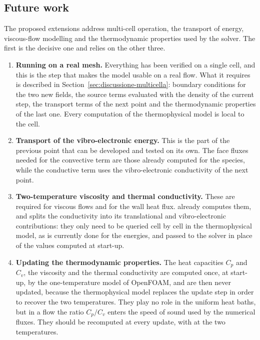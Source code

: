 \subsection{Future work}
\label{sec:sviluppi}

The proposed extensions address multi-cell operation, the transport of
energy, viscous-flow modelling and the thermodynamic properties used by the
solver. The first is the decisive one and relies on the other three.

\begin{enumerate}[leftmargin=1.8em]
  \item \textbf{Running on a real mesh.} Everything has been verified on a
    single cell, and this is the step that makes the model usable on a real
    flow. What it requires is described in
    Section~\ref{sec:discussione-multicella}: boundary conditions for the two
    new fields, the source terms evaluated with the density of the current
    step, the transport terms of the next point and the thermodynamic
    properties of the last one. Every computation of the thermophysical model
    is local to the cell.
  \item \textbf{Transport of the vibro-electronic energy.} This is the part
    of the previous point that can be developed and tested on its own. The
    face fluxes needed for the convective term are those already computed for
    the species, while the conductive term uses the vibro-electronic
    conductivity of the next point.
  \item \textbf{Two-temperature viscosity and thermal conductivity.} These are
    required for viscous flows and for the wall heat flux. \mpp{} already
    computes them, and splits the conductivity into its translational and
    vibro-electronic contributions: they only need to be queried cell by cell
    in the thermophysical model, as is currently done for the energies, and
    passed to the solver in place of the values computed at start-up.
  \item \textbf{Updating the thermodynamic properties.} The heat capacities
    $C_p$ and $C_v$, the viscosity and the thermal conductivity are computed
    once, at start-up, by the one-temperature model of OpenFOAM, and are then
    never updated, because the thermophysical model replaces the update step
    in order to recover the two temperatures. They play no role in the
    uniform heat baths, but in a flow the ratio $C_p/C_v$ enters the speed of
    sound used by the numerical fluxes. They should be recomputed at every
    update, with \mpp{} at the two temperatures.
\end{enumerate}
